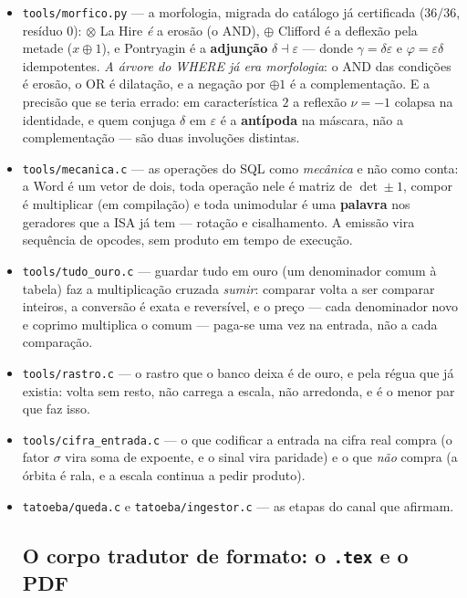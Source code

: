 \documentclass[11pt]{article}
\newcommand{\code}[1]{\texttt{\small #1}}
\theoremstyle{plain}
\theoremstyle{remark}
\begin{document}
\begin{itemize}
\emph{O que a guarda faz, dito com precisão: ela decide se a comparação é \textbf{permitida}. Não
a torna correta.} São duas coisas, e ia entregá-las como uma.
\item \code{tools/morfico.py} --- a morfologia, migrada do catálogo já certificada ($36/36$,
resíduo $0$): $\otimes$ La Hire \emph{é} a erosão (o AND), $\oplus$ Clifford é a deflexão pela
metade ($x\oplus1$), e Pontryagin é a \textbf{adjunção} $\delta\dashv\varepsilon$ --- donde
$\gamma=\delta\varepsilon$ e $\varphi=\varepsilon\delta$ idempotentes. \emph{A árvore do WHERE já
era morfologia}: o AND das condições é erosão, o OR é dilatação, e a negação por $\oplus1$ é a
complementação. E a precisão que se teria errado: em característica $2$ a reflexão $\nu=-1$ colapsa
na identidade, e quem conjuga $\delta$ em $\varepsilon$ é a \textbf{antípoda} na máscara, não a
complementação --- são duas involuções distintas.
\item \code{tools/mecanica.c} --- as operações do SQL como \emph{mecânica} e não como conta: a
Word é um vetor de dois, toda operação nele é matriz de $\det\pm1$, compor é multiplicar (em
compilação) e toda unimodular é uma \textbf{palavra} nos geradores que a ISA já tem --- rotação e
cisalhamento. A emissão vira sequência de opcodes, sem produto em tempo de execução.
\item \code{tools/tudo\_ouro.c} --- guardar tudo em ouro (um denominador comum à tabela) faz a
multiplicação cruzada \emph{sumir}: comparar volta a ser comparar inteiros, a conversão é exata e
reversível, e o preço --- cada denominador novo e coprimo multiplica o comum --- paga-se uma vez
na entrada, não a cada comparação.
\item \code{tools/rastro.c} --- o rastro que o banco deixa é de ouro, e pela régua que já
existia: volta sem resto, não carrega a escala, não arredonda, e é o menor par que faz isso.
\item \code{tools/cifra\_entrada.c} --- o que codificar a entrada na cifra real compra (o fator
$\sigma$ vira soma de expoente, e o sinal vira paridade) e o que \emph{não} compra (a órbita é
rala, e a escala continua a pedir produto).
\item \code{tatoeba/queda.c} e \code{tatoeba/ingestor.c} --- as etapas do canal que afirmam.

\subsection{O corpo tradutor de formato: o \code{.tex} e o PDF}


\end{itemize}
\end{document}
